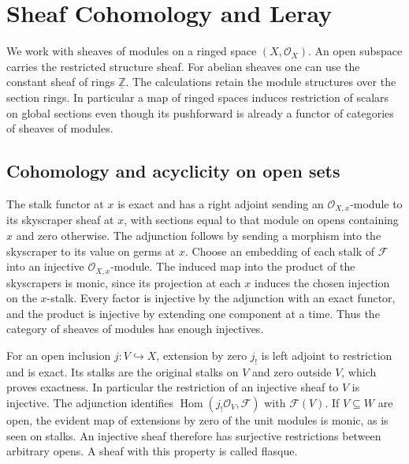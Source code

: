 \chapter{Sheaf Cohomology and Leray}
\label{ch:sheaves}

We work with sheaves of modules on a ringed space \((X,\mathcal O_X)\).
An open subspace carries the restricted structure sheaf. For abelian
sheaves one can use the constant sheaf of rings \(\underline{\mathbb Z}\).
The calculations retain the module structures over the section rings.
In particular a map of ringed spaces induces restriction of scalars
on global sections even though its pushforward is already a functor of
categories of sheaves of modules.

\section{Cohomology and acyclicity on open sets}

The stalk functor at \(x\) is exact and has a right adjoint sending an
\(\mathcal O_{X,x}\)-module to its skyscraper sheaf at \(x\), with
sections equal to that module on opens containing \(x\) and zero
otherwise. The adjunction follows by sending a morphism into the
skyscraper to its value on germs at \(x\). Choose an embedding of each
stalk of \(\mathcal F\) into an injective \(\mathcal O_{X,x}\)-module.
The induced map into the product of the skyscrapers is monic, since
its projection at each \(x\) induces the chosen injection on the
\(x\)-stalk. Every factor is injective by the adjunction with an exact
functor, and the product is injective by extending one component at
a time. Thus the category of sheaves of modules has enough injectives.

For an open inclusion \(j:V\hookrightarrow X\), extension by zero
\(j_!\) is left adjoint to restriction and is exact. Its stalks are the
original stalks on \(V\) and zero outside \(V\), which proves exactness.
In particular the restriction of an injective sheaf to \(V\) is
injective. The adjunction identifies
\(\operatorname{Hom}(j_!\mathcal O_V,\mathcal F)\) with \(\mathcal F(V)\).
If \(V\subseteq W\) are open, the evident map of extensions by zero
of the unit modules is monic, as is seen on stalks. An injective
sheaf therefore has surjective restrictions between arbitrary opens.
A sheaf with this property is called flasque.

